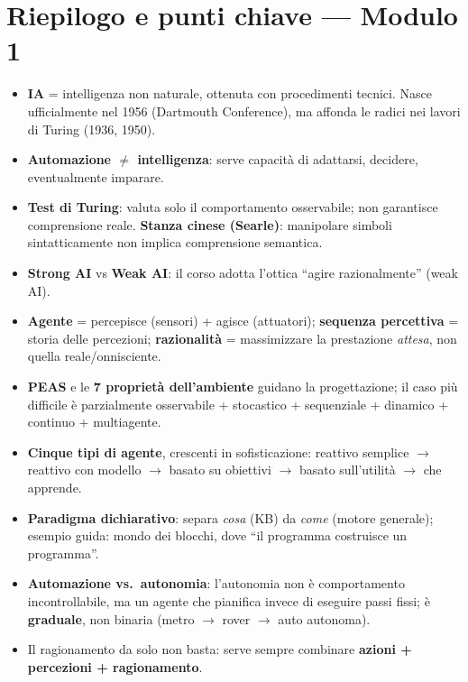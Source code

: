 \documentclass[11pt,a4paper]{report}
\begin{document}
\section*{Riepilogo e punti chiave --- Modulo 1}

\begin{itemize}
  \item \textbf{IA} = intelligenza non naturale, ottenuta con procedimenti tecnici. Nasce ufficialmente nel 1956 (Dartmouth Conference), ma affonda le radici nei lavori di Turing (1936, 1950).
  \item \textbf{Automazione $\neq$ intelligenza}: serve capacità di adattarsi, decidere, eventualmente imparare.
  \item \textbf{Test di Turing}: valuta solo il comportamento osservabile; non garantisce comprensione reale. \textbf{Stanza cinese (Searle)}: manipolare simboli sintatticamente non implica comprensione semantica.
  \item \textbf{Strong AI} vs \textbf{Weak AI}: il corso adotta l'ottica ``agire razionalmente'' (weak AI).
  \item \textbf{Agente} = percepisce (sensori) + agisce (attuatori); \textbf{sequenza percettiva} = storia delle percezioni; \textbf{razionalità} = massimizzare la prestazione \emph{attesa}, non quella reale/onnisciente.
  \item \textbf{PEAS} e le \textbf{7 proprietà dell'ambiente} guidano la progettazione; il caso più difficile è parzialmente osservabile + stocastico + sequenziale + dinamico + continuo + multiagente.
  \item \textbf{Cinque tipi di agente}, crescenti in sofisticazione: reattivo semplice $\to$ reattivo con modello $\to$ basato su obiettivi $\to$ basato sull'utilità $\to$ che apprende.
  \item \textbf{Paradigma dichiarativo}: separa \emph{cosa} (KB) da \emph{come} (motore generale); esempio guida: mondo dei blocchi, dove ``il programma costruisce un programma''.
  \item \textbf{Automazione vs.\ autonomia}: l'autonomia non è comportamento incontrollabile, ma un agente che pianifica invece di eseguire passi fissi; è \textbf{graduale}, non binaria (metro $\to$ rover $\to$ auto autonoma).
  \item Il ragionamento da solo non basta: serve sempre combinare \textbf{azioni + percezioni + ragionamento}.
\end{itemize}
\end{document}
